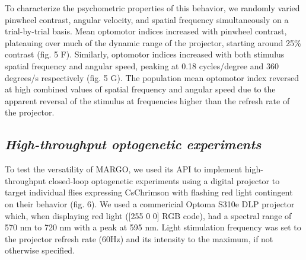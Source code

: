 \documentclass[10pt,letterpaper]{article}
\begin{document}
To characterize the psychometric properties of this behavior, we randomly varied pinwheel contrast, angular velocity, and spatial frequency simultaneously on a trial-by-trial basis. Mean optomotor indices increased with pinwheel contrast, plateauing over much of the dynamic range of the projector, starting around 25\% contrast (fig. 5 F). Similarly, optomotor indices increased with both stimulus spatial frequency and angular speed, peaking at 0.18 cycles/degree and 360 degrees/s respectively (fig. 5 G). The population mean optomotor index reversed at high combined values of spatial frequency and angular speed due to the apparent reversal of the stimulus at frequencies higher than the refresh rate of the projector.

\subsection*{\textit{High-throughput optogenetic experiments}}

To test the versatility of MARGO, we used its API to implement high-throughput closed-loop optogenetic experiments using a digital projector to target individual flies expressing CsChrimson \cite{griebel_2014,Klapoetke_Independent_2014} with flashing red light contingent on their behavior (fig. 6). We used a commericial Optoma S310e DLP projector which, when displaying red light ([255 0 0] RGB code), had a spectral range of 570 nm to 720 nm with a peak at 595 nm. Light stimulation frequency was set to the projector refresh rate (60Hz) and its intensity to the maximum, if not otherwise specified.
\end{document}
